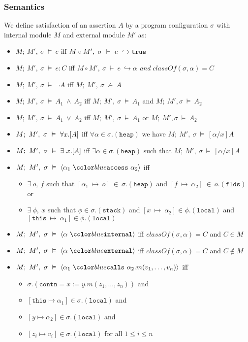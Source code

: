 \documentclass[acmsmall,review,anonymous]{acmart}\settopmatter{printfolios=true,printccs=false,printacmref=false}
\begin{document}
\subsubsection{Semantics}
\begin{definition} 
We define satisfaction of an assertion $A$ by a program configuration $\sigma$ with internal module $M$ and external module $M'$ as:
\begin{itemize}
\item
$M;\ M',\ \sigma\ \vDash\ e$ iff $M \circ M',\ \sigma\ \vdash\ e\ \hookrightarrow \true$
\item
$M;\ M',\ \sigma\ \vDash\ e : C$ iff $M \circ M',\ \sigma\ \vdash\ e\ \hookrightarrow \alpha$ \textit{and} $\textit{classOf}(\sigma, \alpha) = C$
\item
$M;\ M',\ \sigma\ \vDash\ \neg A$ iff $M;\ M',\ \sigma\ \not\vDash\ A$
\item
$M;\ M',\ \sigma\ \vDash\ A_1\ \wedge\ A_2$ iff $M;\ M',\ \sigma\ \vDash\ A_1$ and $M;\ M', \sigma\ \vDash\ A_2$
\item
$M;\ M',\ \sigma\ \vDash\ A_1\ \vee\ A_2$ iff $M;\ M',\ \sigma\ \vDash\ A_1$ or $M;\ M', \sigma\ \vDash\ A_2$
\item
$M;\ M',\ \sigma\ \vDash\ \all{x}{A}$ iff $\forall \alpha \in \sigma.(\texttt{heap})$ we have $M;\ M',\ \sigma\ \vDash\ [\alpha/x]A$
\item
$M;\ M',\ \sigma\ \vDash\ \ex{x}{A}$ iff $\exists \alpha \in \sigma.(\texttt{heap})$ such that $M;\ M',\ \sigma\ \vDash\ [\alpha/x]A$
\item
$M;\ M',\ \sigma\ \vDash\ \access{\alpha_1}{\alpha_2}$ iff 
\begin{itemize}
\item
$\exists\ o,\ f$ such that $[\alpha_1\ \mapsto\ o]\ \in\ \sigma.(\texttt{heap})$ and $[f\ \mapsto\ \alpha_2]\ \in\ o.(\texttt{flds})$ or
\item
$\exists\ \phi,\ x$ such that $\phi \in \sigma.(\texttt{stack})$ and $[x\ \mapsto\ \alpha_2]\in\phi.(\texttt{local})$ and $[\texttt{this}\ \mapsto\ \alpha_1]\in\phi.(\texttt{local})$
\end{itemize}
\item
$M;\ M',\ \sigma\ \vDash\ \internal{\alpha}$ iff $\textit{classOf}(\sigma,\alpha) = C$ and $C \in M$
\item
$M;\ M',\ \sigma\ \vDash\ \external{\alpha}$ iff $\textit{classOf}(\sigma,\alpha) = C$ and $C \not\in M$
\item
$M;\ M',\ \sigma\ \vDash\ \calls{\alpha_1}{\alpha_2}{m}{v_1, \ldots, v_n}$ iff
\begin{itemize}
\item
$\sigma.(\texttt{contn} = x := y.m(z_1,\ldots,z_n))$ and 
\item
$[\texttt{this}\mapsto \alpha_1]\in\sigma.(\texttt{local})$ and
\item
$[y\mapsto \alpha_2]\in\sigma.(\texttt{local})$ and
\item
$[z_i\mapsto v_i]\in\sigma.(\texttt{local})$ for all $1 \leq i \leq n$
\end{itemize}
\end{itemize}
\end{definition}
\end{document}
